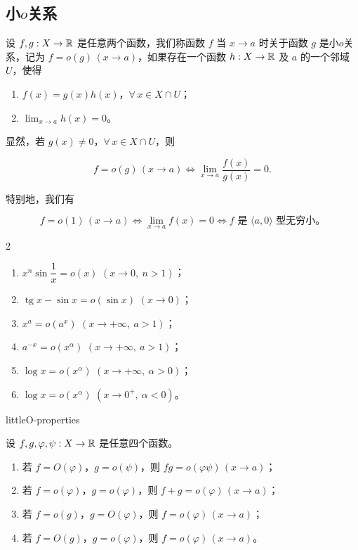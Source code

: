 \subsection{小$o$关系}
	\label{sec:8-1-2}

\begin{mydef*}{}

设 $f,g:X\to\mathbb{R}$ 是任意两个函数，我们称函数 $f$ 当 $x\to a$ 时关于函数 $g$ 是小$o$关系，记为 $f=o(g)\,(x\to a)$，如果存在一个函数 $h:X\to\mathbb{R}$ 及 $a$ 的一个邻域 $U$，使得

\begin{enumerate}[label=\arabic{enumi})]
\item $f(x)=g(x)h(x)$，$\forall\,x\in X\cap U$；
\item $\displaystyle\lim_{x\to a}h(x)=0$。
\end{enumerate}

\end{mydef*}

显然，若 $g(x)\neq0$，$\forall\,x\in X\cap U$，则

\[f=o(g)\,(x\to a)\Longleftrightarrow\lim_{x\to a}\frac{f(x)}{g(x)}=0.\]

特别地，我们有

\[f=o(1)\,(x\to a)\Longleftrightarrow\lim_{x\to a}f(x)=0\Longleftrightarrow f\text{ 是 }\langle a,0\rangle\text{ 型无穷小。}\]

\begin{sourceexample}{2}

\begin{enumerate}[label=\arabic{enumi})]
\item $x^n\sin\dfrac{1}{x}=o(x)$ $(x\to0,\ n>1)$；
\item $\operatorname{tg}x-\sin x=o(\sin x)$ $(x\to0)$；
\item $x^a=o(a^x)$ $(x\to+\infty,\ a>1)$；
\item $a^{-x}=o(x^{\alpha})$ $(x\to+\infty,\ a>1)$；
\item $\log x=o(x^{\alpha})$ $(x\to+\infty,\ \alpha>0)$；
\item $\log x=o(x^{\alpha})$ $(x\to0^{+},\ \alpha<0)$。
\end{enumerate}

\end{sourceexample}

\begin{mythm}{}{littleO-properties}

设 $f,g,\varphi,\psi:X\to\mathbb{R}$ 是任意四个函数。

\begin{enumerate}[label=\arabic{enumi})]
\item 若 $f=O(\varphi)$，$g=o(\psi)$，则 $fg=o(\varphi\psi)\,(x\to a)$；
\item 若 $f=o(\varphi)$，$g=o(\varphi)$，则 $f+g=o(\varphi)\,(x\to a)$；
\item 若 $f=o(g)$，$g=O(\varphi)$，则 $f=o(\varphi)\,(x\to a)$；
\item 若 $f=O(g)$，$g=o(\varphi)$，则 $f=o(\varphi)\,(x\to a)$。
\end{enumerate}

\end{mythm}

